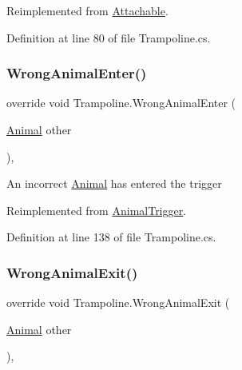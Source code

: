 Reimplemented from \mbox{\hyperlink{class_attachable_abb659a66efacd6fa09fa1d7125c7b5e6}{Attachable}}.



Definition at line 80 of file Trampoline.\+cs.

\mbox{\label{class_trampoline_a7ffb817b148f86e9cc5dd7faa1af7c0c}} 
\subsubsection{\texorpdfstring{Wrong\+Animal\+Enter()}{WrongAnimalEnter()}}
{\footnotesize\ttfamily override void Trampoline.\+Wrong\+Animal\+Enter (\begin{DoxyParamCaption}\item[{\mbox{\hyperlink{class_animal}{Animal}}}]{other }\end{DoxyParamCaption})\hspace{0.3cm}{\ttfamily [protected]}, {\ttfamily [virtual]}}



An incorrect \mbox{\hyperlink{class_animal}{Animal}} has entered the trigger 



Reimplemented from \mbox{\hyperlink{class_animal_trigger_a7a27e866d74251de063bb4a36c99e99d}{Animal\+Trigger}}.



Definition at line 138 of file Trampoline.\+cs.

\mbox{\label{class_trampoline_ac7806793d08278aafaac93d0ac552e51}} 
\subsubsection{\texorpdfstring{Wrong\+Animal\+Exit()}{WrongAnimalExit()}}
{\footnotesize\ttfamily override void Trampoline.\+Wrong\+Animal\+Exit (\begin{DoxyParamCaption}\item[{\mbox{\hyperlink{class_animal}{Animal}}}]{other }\end{DoxyParamCaption})\hspace{0.3cm}{\ttfamily [protected]}, {\ttfamily [virtual]}}



